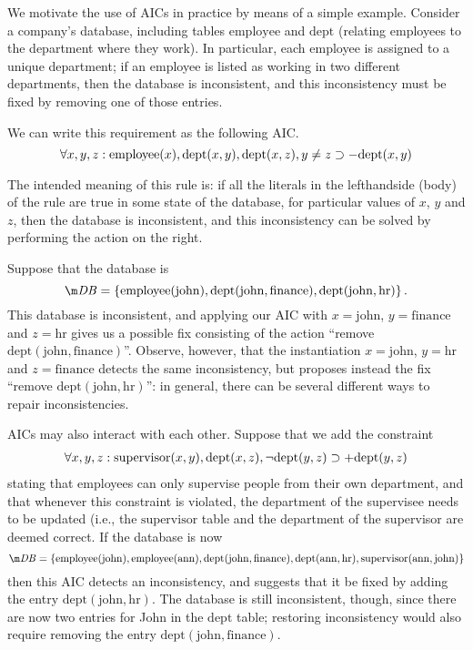 \documentclass[runningheads]{llncs}
\begin{document}
\begin{example}\label{ex:intro}
  We motivate the use of AICs in practice by means of a simple example.
  Consider a company's database, including tables $\mathrm{employee}$ and $\mathrm{dept}$ (relating employees to the department where they work).
  In particular, each employee is assigned to a unique department; if an employee is listed as working in two different departments, then the database is inconsistent, and this inconsistency must be fixed by removing one of those entries.

  We can write this requirement as the following AIC.
  \[
  \forall x, y, z: \mathrm{employee}(x),\mathrm{dept}(x,y),\mathrm{dept}(x,z),y\neq z \supset -\mathrm{dept}(x,y)
  \]

  The intended meaning of this rule is: if all the literals in the lefthandside (body) of the rule are true in some state of the database, for particular values of $x$, $y$ and $z$, then the database is inconsistent, and this inconsistency can be solved by performing the action on the right.

  Suppose that the database is
  \[\db=\{\mathrm{employee}(\mathrm{john}),\mathrm{dept}(\mathrm{john},\mathrm{finance}),\mathrm{dept}(\mathrm{john},\mathrm{hr})\}\,.\]
  This database is inconsistent, and applying our AIC with $x=\mathrm{john}$, $y=\mathrm{finance}$ and $z=\mathrm{hr}$ gives us a possible fix consisting of the action ``remove $\mathrm{dept}(\mathrm{john},\mathrm{finance})$''.
  Observe, however, that the instantiation $x=\mathrm{john}$, $y=\mathrm{hr}$ and $z=\mathrm{finance}$ detects the same inconsistency, but proposes instead the fix ``remove $\mathrm{dept}(\mathrm{john},\mathrm{hr})$'': in general, there can be several different ways to repair inconsistencies.

  AICs may also interact with each other.
  Suppose that we add the constraint
  \begin{align} \forall x, y, z: \mathrm{supervisor}(x,y),\mathrm{dept}(x,z),\neg\mathrm{dept}(y,z)\supset +\mathrm{dept}(y,z)\label{rule:dept}\end{align}
  stating that employees can only supervise people from their own department, and that whenever this constraint is violated, the department of the supervisee needs to be updated (i.e., the  $\mathrm{supervisor}$ table and the department of the supervisor are deemed correct. 
  If the database is now
  \[
    \db=\{\mathrm{employee}(\mathrm{john}),\mathrm{employee}(\mathrm{ann}),
    \mathrm{dept}(\mathrm{john},\mathrm{finance}),\mathrm{dept}(\mathrm{ann},\mathrm{hr}),
    \mathrm{supervisor}(\mathrm{ann},\mathrm{john})\}
  \]
  then this AIC detects an inconsistency, and suggests that it be fixed by adding the entry $\mathrm{dept}(\mathrm{john},\mathrm{hr})$.
  The database is still inconsistent, though, since there are now two entries for John in the $\mathrm{dept}$ table; restoring inconsistency would also require removing the entry $\mathrm{dept}(\mathrm{john},\mathrm{finance})$.


\end{example}
\end{document}

